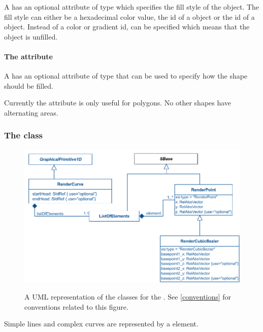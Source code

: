 A \GraphicalPrimitiveTwoD has an optional attribute  of type
 which specifies 
the fill style of the object. The fill style can either be a hexadecimal
color value, the id of a \ColorDefinition object or the id of a \GradientBase
object. 
Instead of a color or gradient id,  can be specified
 which means that the object is unfilled.


\paragraph{The \fixttspace{} attribute}

A \GraphicalPrimitiveTwoD has an optional attribute  of
type \FillRule that can be used to specify how the shape should be filled. 

Currently the  attribute is only useful for polygons. No other shapes have alternating areas.

\subsubsection{The  class}
\label{rendercurve-class}
\begin{figure}[h!]
  \centering
  \includegraphics[width=\textwidth]{images/render-curve-uml}\\
  \caption{A UML representation of the \RenderCurve classes for the \RenderPackage.  See \ref{conventions} for conventions related to this figure. }
  \label{fig:curve_render_uml}
\end{figure}

Simple lines and complex curves are represented by a \RenderCurve element. 

